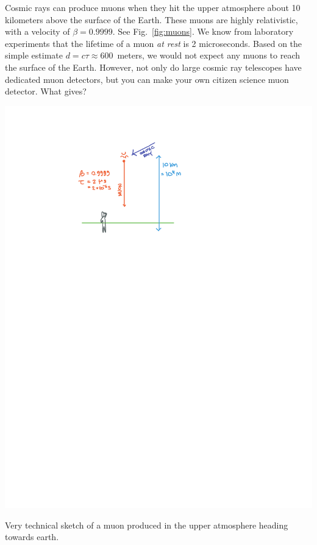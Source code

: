 Cosmic rays can produce muons when they hit the upper atmosphere about 10 kilometers above the surface of the Earth. These muons are highly relativistic, with a velocity of $\beta = 0.9999$. See Fig.~\ref{fig:muons}. We know from laboratory experiments that the lifetime of a muon \emph{at rest} is 2 microseconds. Based on the simple estimate $d=c\tau \approx 600$~meters, we would not expect any muons to reach the surface of the Earth. However, not only do large cosmic ray telescopes have dedicated muon detectors, but you can make your own citizen science muon detector. What gives?
\begin{marginfigure}%
    \includegraphics[width=\textwidth]{figures/muon.pdf}
    \caption{Very technical sketch of a muon produced in the upper atmosphere heading towards earth. \label{fig:muons}} 
\end{marginfigure}
